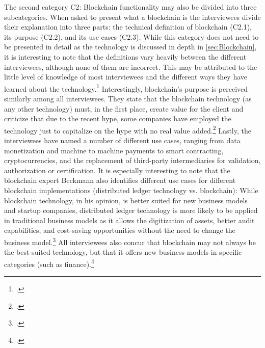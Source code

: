 The second category C2: Blockchain functionality may also be divided into three subcategories. When asked to present what a blockchain is the interviewees divide their explanation into three parts: the technical definition of blockchain (C2.1), its purpose (C2.2), and its use cases (C2.3). While this category does not need to be presented in detail as the technology is discussed in depth in \ref{sec:Blockchain}, it is interesting to note that the definitions vary heavily between the different interviewees, although none of them are incorrect. This may be attributed to the little level of knowledge of most interviewees and the different ways they have learned about the technology.\footcites[Cf.][P3]{DanielKaltenbach_Interview}[cf.][P58]{BjoernPaulewicz_Interview}[cf.][P91]{RalphBeckmann_Interview} Interestingly, blockchain's purpose is perceived similarly among all interviewees. They state that the blockchain technology (as any other technology) must, in the first place, create value for the client and criticize that due to the recent hype, some companies have employed the technology just to capitalize on the hype with no real value added.\footcites[Cf.][P23, P25, P26, P27]{DanielKaltenbach_Interview}[cf.][P69]{BjoernPaulewicz_Interview}[cf.][P92, P114, P117]{RalphBeckmann_Interview} Lastly, the interviewees have named a number of different use cases, ranging from data monetization and machine to machine payments to smart contracting, cryptocurrencies, and the replacement of third-party intermediaries for validation, authorization or certification. It is especially interesting to note that the blockchain expert Beckmann also identifies different use cases for different blockchain implementations (distributed ledger technology vs. blockchain): While blockchain technology, in his opinion, is better suited for new business models and startup companies, distributed ledger technology is more likely to be applied in traditional business models as it allows the digitization of assets, better audit capabilities, and cost-saving opportunities without the need to change the business model.\footcite[Cf.][P105, P106]{RalphBeckmann_Interview} All interviewees also concur that blockchain may not always be the best-suited technology, but that it offers new business models in specific categories (such as finance).\footcites[Cf.][P14, P17]{DanielKaltenbach_Interview}[cf.][P57, P80, P77]{BjoernPaulewicz_Interview}[cf.][P103, P194, P105, P106, P107]{RalphBeckmann_Interview}[cf.][P147]{BerndKammholz_Interview}

